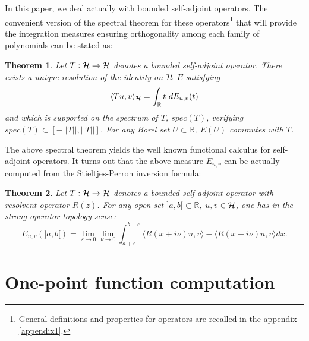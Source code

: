 \documentclass[a4paper,11pt,twoside]{article}
\numberwithin{equation}{section}
\newtheorem{atheorem}{Theorem}
\theoremstyle{nonumberplain}
\begin{document}
In this paper, we deal actually with bounded self-adjoint operators. The convenient version of the spectral theorem for these operators{\footnote{General definitions and properties for operators are recalled in the appendix \ref{appendix1}.}} that will provide the integration measures ensuring orthogonality among each family of polynomials can be stated as:
\begin{atheorem}\label{orthop-1}
Let $T:{\cal{H}}\to{\cal{H}}$ denotes a bounded self-adjoint operator. There exists a unique resolution of the identity on ${\cal{H}} $ $E$ satisfying 
\begin{equation}
\langle Tu,v \rangle_{\cal{H}}=\int_{\mathbb{R}}t\ dE_{u,v}(t)\label{spectral-kinetic-operat}
\end{equation}
and which is supported on the spectrum of $T$, $spec(T)$, verifying $spec(T)\subset[-||T|| ,||T||]$. For any Borel set $U\subset\mathbb{R}$, $E(U)$ commutes with $T$.
\end{atheorem}
The above spectral theorem yields the well known functional calculus for self-adjoint operators. It turns out that the above measure $E_{u,v}$ can be actually computed from the Stieltjes-Perron inversion formula:
\begin{atheorem}\label{stieltjes-perron}
Let $T:{\cal{H}}\to{\cal{H}}$ denotes a bounded self-adjoint operator with resolvent operator $R(z)$. For any open set $]a,b[\subset\mathbb{R}$, $u,v\in\cal{H}$, one has in the strong operator topology sense:
\begin{equation}
E_{u,v}(]a,b[)=\lim_{\varepsilon\to0}\lim_{\nu\to0 }\int_{a+\varepsilon}^{b-\varepsilon}\langle R(x+i\nu)u,v \rangle-\langle R(x-i\nu)u,v \rangle dx.
\end{equation}
\end{atheorem}


\section{One-point function computation}\label{onepoint-comput}
\end{document}
